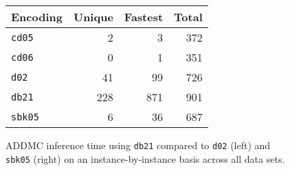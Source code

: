 \documentclass{article}
\theoremstyle{definition}
\theoremstyle{remark}
\begin{document}
{\begin{figure}
  \centering
  \begin{minipage}{0.59\textwidth}
    \centering
  \end{minipage}
  \begin{minipage}{0.39\textwidth}
    \centering
    \begin{tabular}{lrrr}
      \toprule
      Encoding & Unique & Fastest & Total \\
      \midrule
      \texttt{cd05} & 2 & 3 & 372 \\
      \texttt{cd06} & 0 & 1 & 351 \\
      \texttt{d02} & 41 & 99 & 726 \\
      \texttt{db21} & 228 & 871 & 901 \\
      \texttt{sbk05} & 6 & 36 & 687 \\
      \bottomrule
    \end{tabular}
  \end{minipage}
\end{figure}

\begin{figure}
  \centering
  \caption{ADDMC inference time using \texttt{db21} compared to \texttt{d02}
    (left) and \texttt{sbk05} (right) on an instance-by-instance basis across
    all data sets.}
\end{figure}


}
\end{document}
